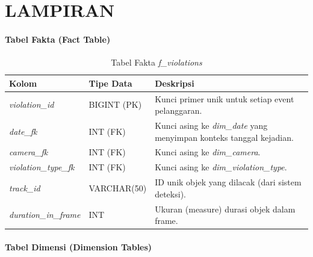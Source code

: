 
\chapter{LAMPIRAN}

\label{app:star_schema}

\subsubsection{Tabel Fakta (Fact Table)}


\begin{table}[H]
\centering
\caption{Tabel Fakta \textit{f\_violations}}
\label{tab:fact_violations}
\small\setlength{\tabcolsep}{4pt}\begin{tabularx}{\textwidth}{>{\raggedright\arraybackslash}p{}>{\raggedright\arraybackslash}p{}>{\raggedright\arraybackslash}X}
\toprule
\textbf{Kolom} & \textbf{Tipe Data} & \textbf{Deskripsi} \\
\midrule
\textit{violation\_id} & BIGINT (PK) & Kunci primer unik untuk setiap event pelanggaran. \\
\textit{date\_fk} & INT (FK) & Kunci asing ke \textit{dim\_date} yang menyimpan konteks tanggal kejadian. \\
\textit{camera\_fk} & INT (FK) & Kunci asing ke \textit{dim\_camera}. \\
\textit{violation\_type\_fk} & INT (FK) & Kunci asing ke \textit{dim\_violation\_type}. \\
\textit{track\_id} & VARCHAR(50) & ID unik objek yang dilacak (dari sistem deteksi). \\
\textit{duration\_in\_frame} & INT & Ukuran (measure) durasi objek dalam frame. \\
\bottomrule
\end{tabularx}
\end{table}

\subsubsection{Tabel Dimensi (Dimension Tables)}


